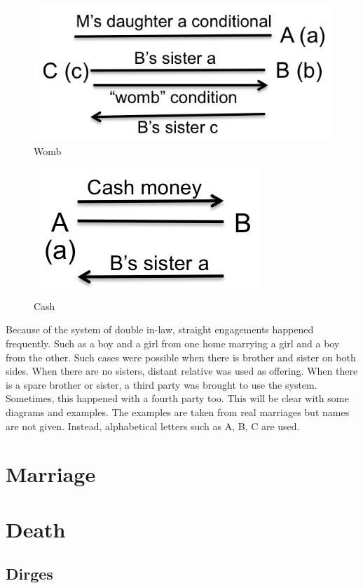 \begin{figure}
\center
\includegraphics{figures/engagement/womb_7}
\caption{Womb
\label{figure:engage_7}}
\end{figure}

\begin{figure}
\center
\includegraphics{figures/engagement/cash_8}
\caption{Cash
\label{figure:engage_8}}
\end{figure}

Because of the system of double in-law, straight engagements happened
frequently. Such as a boy and a girl from one home marrying a girl and a boy
from the other. Such cases were possible when there is brother and sister on
both sides. When there are no sisters, distant relative was used as offering.
When there is a spare brother or sister, a third party was brought to use the
system. Sometimes, this happened with a fourth party too. This will be clear
with some diagrams and examples. The examples are taken from real marriages but
names are not given. Instead, alphabetical letters such as A, B, C are used.

\section{Marriage}

\section{Death}

\subsection{Dirges}
